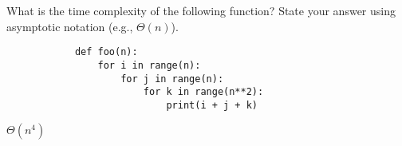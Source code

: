 \begin{prob}
    What is the time complexity of the following function?
    State your answer using asymptotic notation (e.g., $\Theta(n)$).

    \begin{verbatim}
            def foo(n):
                for i in range(n):
                    for j in range(n):
                        for k in range(n**2):
                            print(i + j + k)
    \end{verbatim}

    \begin{soln}
        $\Theta(n^4)$
    \end{soln}

\end{prob}
